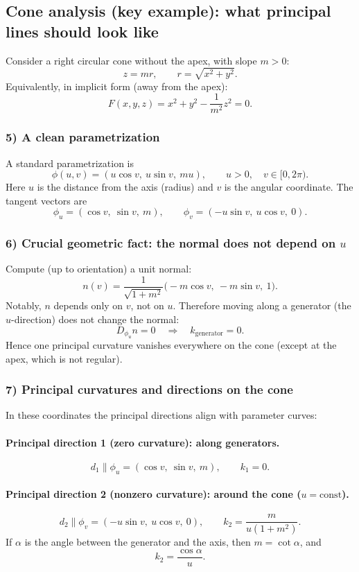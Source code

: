 \documentclass[12pt,a4paper]{article}
\theoremstyle{plain}
\theoremstyle{definition}      %
\begin{document}
\subsection*{Cone analysis (key example): what principal lines should look like}

Consider a right circular cone without the apex, with slope $m>0$:
\[
z = m r,
\qquad 
r=\sqrt{x^2+y^2}.
\]
Equivalently, in implicit form (away from the apex):
\[
F(x,y,z)=x^2+y^2-\frac{1}{m^2}z^2=0.
\]

\subsubsection*{5) A clean parametrization}
A standard parametrization is
\[
\phi(u,v)=(u\cos v,\ u\sin v,\ m u),
\qquad u>0,\quad v\in[0,2\pi).
\]
Here $u$ is the distance from the axis (radius) and $v$ is the angular coordinate.
The tangent vectors are
\[
\phi_u=(\cos v,\ \sin v,\ m),
\qquad
\phi_v=(-u\sin v,\ u\cos v,\ 0).
\]

\subsubsection*{6) Crucial geometric fact: the normal does not depend on $u$}
Compute (up to orientation) a unit normal:
\[
n(v)=\frac{1}{\sqrt{1+m^2}}\bigl(-m\cos v,\ -m\sin v,\ 1\bigr).
\]
Notably, $n$ depends only on $v$, not on $u$.
Therefore moving along a generator (the $u$-direction) does not change the normal:
\[
D_{\phi_u} n = 0
\quad\Longrightarrow\quad
k_{\text{generator}}=0.
\]
Hence one principal curvature vanishes everywhere on the cone (except at the apex, which is not regular).

\subsubsection*{7) Principal curvatures and directions on the cone}
In these coordinates the principal directions align with parameter curves:

\paragraph{Principal direction 1 (zero curvature): along generators.}
\[
d_1 \parallel \phi_u=(\cos v,\ \sin v,\ m),
\qquad
k_1=0.
\]

\paragraph{Principal direction 2 (nonzero curvature): around the cone ($u=\mathrm{const}$).}
\[
d_2 \parallel \phi_v=(-u\sin v,\ u\cos v,\ 0),
\qquad
k_2=\frac{m}{u(1+m^2)}.
\]
If $\alpha$ is the angle between the generator and the axis, then $m=\cot\alpha$, and
\[
k_2=\frac{\cos\alpha}{u}.
\]
\end{document}
